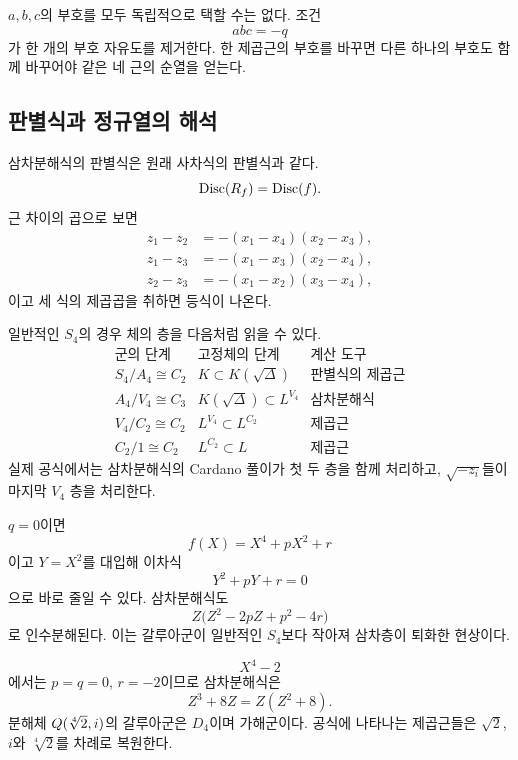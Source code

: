 \begin{pitfall}[제곱근의 부호]
$a,b,c$의 부호를 모두 독립적으로 택할 수는 없다. 조건
\[
  abc=-q
\]
가 한 개의 부호 자유도를 제거한다. 한 제곱근의 부호를 바꾸면 다른 하나의 부호도 함께 바꾸어야 같은 네 근의 순열을 얻는다.
\end{pitfall}

\subsection{판별식과 정규열의 해석}

삼차분해식의 판별식은 원래 사차식의 판별식과 같다.
\[
  \operatorname{Disc}(R_f)=\operatorname{Disc}(f).
\]
근 차이의 곱으로 보면
\[
\begin{aligned}
 z_1-z_2&=-(x_1-x_4)(x_2-x_3),\\
 z_1-z_3&=-(x_1-x_3)(x_2-x_4),\\
 z_2-z_3&=-(x_1-x_2)(x_3-x_4),
\end{aligned}
\]
이고 세 식의 제곱곱을 취하면 등식이 나온다.

일반적인 $S_4$의 경우 체의 층을 다음처럼 읽을 수 있다.
\[
\begin{array}{c|c|c}
\text{군의 단계} & \text{고정체의 단계} & \text{계산 도구}\\
\hline
S_4/A_4\cong C_2 & K\subset K(\sqrt\Delta) & \text{판별식의 제곱근}\\
A_4/V_4\cong C_3 & K(\sqrt\Delta)\subset L^{V_4} & \text{삼차분해식}\\
V_4/C_2\cong C_2 & L^{V_4}\subset L^{C_2} & \text{제곱근}\\
C_2/1\cong C_2 & L^{C_2}\subset L & \text{제곱근}
\end{array}
\]
실제 공식에서는 삼차분해식의 Cardano 풀이가 첫 두 층을 함께 처리하고, $\sqrt{-z_i}$들이 마지막 $V_4$ 층을 처리한다.

\begin{example}[짝다항식]
$q=0$이면
\[
  f(X)=X^4+pX^2+r
\]
이고 $Y=X^2$를 대입해 이차식
\[
  Y^2+pY+r=0
\]
으로 바로 줄일 수 있다. 삼차분해식도
\[
  Z\bigl(Z^2-2pZ+p^2-4r\bigr)
\]
로 인수분해된다. 이는 갈루아군이 일반적인 $S_4$보다 작아져 삼차층이 퇴화한 현상이다.
\end{example}

\begin{example}
\[
  X^4-2
\]
에서는 $p=q=0$, $r=-2$이므로 삼차분해식은
\[
  Z^3+8Z=Z(Z^2+8).
\]
분해체 $Q(\sqrt[4]{2},i)$의 갈루아군은 $D_4$이며 가해군이다. 공식에 나타나는 제곱근들은 $\sqrt2$, $i$와 $\sqrt[4]{2}$를 차례로 복원한다.
\end{example}

